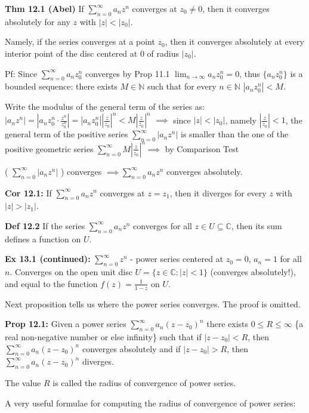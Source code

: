 \documentclass{article}
\begin{document}
\textbf{Thm 12.1 (Abel)} If $\sum_{n=0}^{\infty} a_n z^n$ converges at $z_0 \neq 0$, then it converges absolutely for any $z$ with $|z| < |z_0|$.

Namely, if the series converges at a point $z_0$, then it converges absolutely at every interior point of the disc centered at 0 of radius $|z_0|$.

Pf: Since $\sum_{n=0}^{\infty} a_n z_0^n$ converges by Prop 11.1 $\lim_{n \to \infty} a_n z_0^n = 0$, thus $\{a_n z_0^n\}$ is a bounded sequence: there exists $M \in \mathbb{N}$ such that for every $n \in \mathbb{N}$ $|a_n z_0^n| < M$.

Write the modulus of the general term of the series as: $|a_n z^n| = |a_n z_0^n \cdot \frac{z^n}{z_0^n}| = |a_n z_0^n| \left| \frac{z}{z_0} \right|^n < M \left| \frac{z}{z_0} \right|^n$
$\implies$ since $|z| < |z_0|$, namely $\left| \frac{z}{z_0} \right| < 1$, the general term of the positive series $\sum_{n=0}^{\infty} |a_n z^n|$ is smaller than the one of the positive geometric series $\sum_{n=0}^{\infty} M \left| \frac{z}{z_0} \right|^n \implies$ by Comparison Test

( $\sum_{n=0}^{\infty} |a_n z^n|$ ) converges $\implies \sum_{n=0}^{\infty} a_n z^n$ converges absolutely.

\textbf{Cor 12.1:} If $\sum_{n=0}^{\infty} a_n z^n$ converges at $z = z_1$, then it diverges for every $z$ with $|z| > |z_1|$.

\textbf{Def 12.2} If the series $\sum_{n=0}^{\infty} a_n z^n$ converges for all $z \in U \subseteq \mathbb{C}$, then its sum defines a function on $U$.

\textbf{Ex 13.1 (continued):} $\sum_{n=0}^{\infty} z^n$ - power series centered at $z_0 = 0$, $a_n = 1$ for all $n$. Converges on the open unit disc $U = \{z \in \mathbb{C}: |z| < 1\}$ (converges absolutely!), and equal to the function $f(z) = \frac{1}{1-z}$ on $U$.

Next proposition tells us where the power series converges. The proof is omitted.

\textbf{Prop 12.1:} Given a power series $\sum_{n=0}^{\infty} a_n (z - z_0)^n$ there exists $0 \leq R \leq \infty$ \{a real non-negative number or else infinity\} such that if $|z - z_0| < R$, then $\sum_{n=0}^{\infty} a_n (z - z_0)^n$ converges absolutely and if $|z - z_0| > R$, then $\sum_{n=0}^{\infty} a_n (z - z_0)^n$ diverges.

The value $R$ is called the radius of convergence of power series.

A very useful formulae for computing the radius of convergence of power series:
\end{document}
